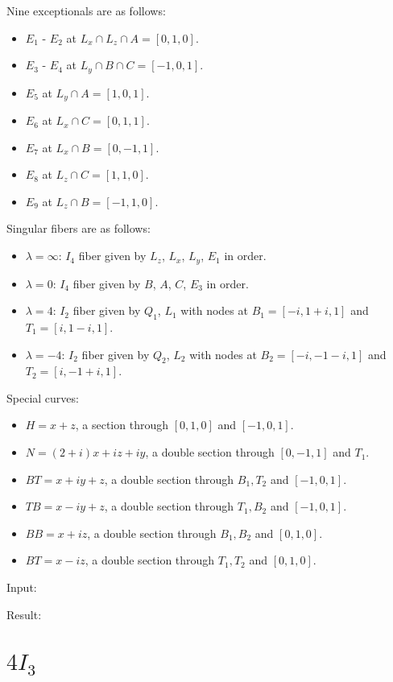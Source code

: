 \documentclass{article}
\begin{document}
Nine exceptionals are as follows:
\begin{itemize}
  \item $E_1$ - $E_2$ at $L_x \cap L_z \cap A = [0,1,0]$.
  \item $E_3$ - $E_4$ at $L_y \cap B \cap C = [-1,0,1]$.
  \item $E_5$ at $L_y \cap A = [1,0,1]$.
  \item $E_6$ at $L_x \cap C = [0,1,1]$.
  \item $E_7$ at $L_x \cap B = [0,-1,1]$.
  \item $E_8$ at $L_z \cap C = [1,1,0]$.
  \item $E_9$ at $L_z \cap B = [-1,1,0]$.
\end{itemize}
Singular fibers are as follows:
\begin{itemize}
  \item $\lambda = \infty$: $I_4$ fiber given by $L_z$, $L_x$, $L_y$, $E_1$ in order.
  \item $\lambda = 0$: $I_4$ fiber given by $B$, $A$, $C$, $E_3$ in order.
  \item $\lambda = 4$: $I_2$ fiber given by $Q_1$, $L_1$ with nodes at $B_1 = [-i,1+i,1]$ and $T_1 = [i,1-i,1]$.
  \item $\lambda = -4$: $I_2$ fiber given by $Q_2$, $L_2$ with nodes at $B_2 = [-i,-1-i,1]$ and $T_2 = [i,-1+i,1]$.
\end{itemize}
Special curves:
\begin{itemize}
  \item $H = x+z$, a section through $[0,1,0]$ and $[-1,0,1]$.
  \item $N = (2+i)x + iz + iy$, a double section through $[0,-1,1]$ and $T_1$.
  \item $BT = x + iy + z$, a double section through $B_1, T_2$ and $[-1,0,1]$.
  \item $TB = x - iy + z$, a double section through $T_1, B_2$ and $[-1,0,1]$.
  \item $BB = x + iz$, a double section through $B_1, B_2$ and $[0,1,0]$.
  \item $BT = x - iz$, a double section through $T_1, T_2$ and $[0,1,0]$.
\end{itemize}

Input:

Result:





\section{$4I_3$}
\end{document}
